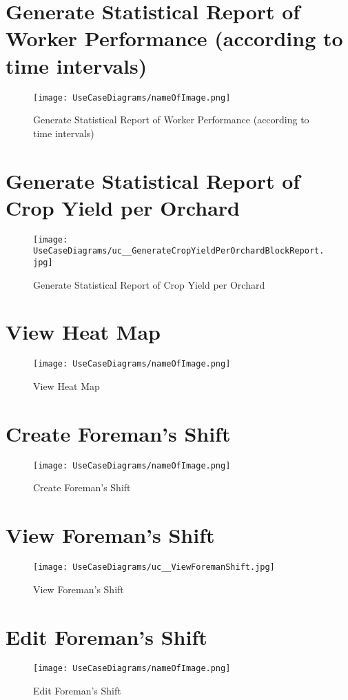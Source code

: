 \documentclass[11pt,fleqn]{book} %
\begin{document}
	\section{Generate Statistical Report of Worker Performance (according to time intervals)}
	\begin{figure}
		\texttt{[image: UseCaseDiagrams/nameOfImage.png]}
		\caption{Generate Statistical Report of Worker Performance (according to time intervals)}
	\end{figure}
	
	\section{Generate Statistical Report of Crop Yield per Orchard}
	\begin{figure}
		\texttt{[image: UseCaseDiagrams/uc\_\_GenerateCropYieldPerOrchardBlockReport.jpg]}
		\caption{Generate Statistical Report of Crop Yield per Orchard}
	\end{figure}
	
	\section{View Heat Map}
	\begin{figure}
		\texttt{[image: UseCaseDiagrams/nameOfImage.png]}
		\caption{View Heat Map}
	\end{figure}
	
	\section{Create Foreman’s Shift}
	\begin{figure}
		\texttt{[image: UseCaseDiagrams/nameOfImage.png]}
		\caption{Create Foreman’s Shift}
	\end{figure}
	
	\section{View Foreman’s Shift}
	\begin{figure}
		\texttt{[image: UseCaseDiagrams/uc\_\_ViewForemanShift.jpg]}
		\caption{View Foreman’s Shift}
	\end{figure}
	
	\section{Edit Foreman’s Shift}
	\begin{figure}
		\texttt{[image: UseCaseDiagrams/nameOfImage.png]}
		\caption{Edit Foreman’s Shift}
	\end{figure}
	
\end{document}
